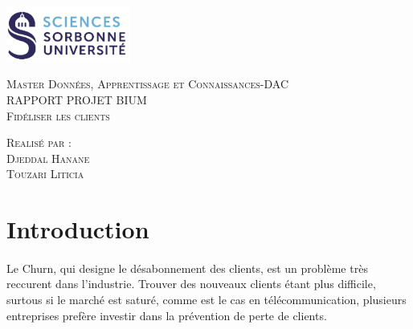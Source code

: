 \documentclass{article}
\begin{document}
\begin{titlepage}
    \begin{flushleft}
    \includegraphics[width=11em]{logo.png}\\[1.5cm]
    \end{flushleft}
    \begin{center}
        \textsc{{\LARGE \color{blue} Master Données, Apprentissage et Connaissances-DAC}}\\[4cm]
        \textsc{\Huge{RAPPORT PROJET BIUM}}\\[1cm]
        \textsc{\Huge{Fidéliser les clients}}\\[5.5cm]
        \begin{minipage}{1\textwidth}
            \begin{flushleft} \large
            \textsc{\LARGE{Realisé par :}}\\[0.5cm]
            \textsc{Djeddal Hanane}\\
            \textsc{Touzari Liticia}\\
            \end{flushleft}
        \end{minipage}
        \vfill
    \end{center}
  \end{titlepage}
  

\tableofcontents					%


\newpage


\section{Introduction}
\paragraph{}
        Le Churn, qui designe le désabonnement des clients, est un problème très reccurent dans l'industrie.
        Trouver des nouveaux clients étant plus difficile, surtous si le marché est saturé, comme
        est le cas en télécommunication, plusieurs entreprises prefère investir dans 
        la prévention de perte de clients.
\end{document}
